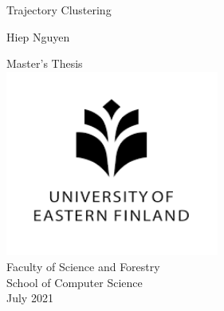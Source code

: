 \def \ajankohtaenglish {July 2021 }
\def \authorname {Hiep Nguyen }
\def \thesistitle {Trajectory Clustering }
\def \campus {Joensuu }
\def \facultyschooleng {School of Computer Science }
\def \supervisorseng {Pasi Fr{\"a}nti and Radu Mariescu-Istodor}

\def \documenttypeeng {Master's Thesis }

\def \mypagecount {70 }

\graphicspath{ {./images/} }


\vspace*{3cm}
\vspace{0.5cm}

\begin{center}
\begin{LARGE}\thesistitle \end{LARGE}

\vspace{1.5cm}

\begin{Large}\authorname \end{Large}


{\large
\documenttypeeng
~\\
\includegraphics[width=7cm]{UEF logo.png}\\
Faculty of Science and Forestry\\
\facultyschooleng \\
\ajankohtaenglish \\
}
\end{center}

